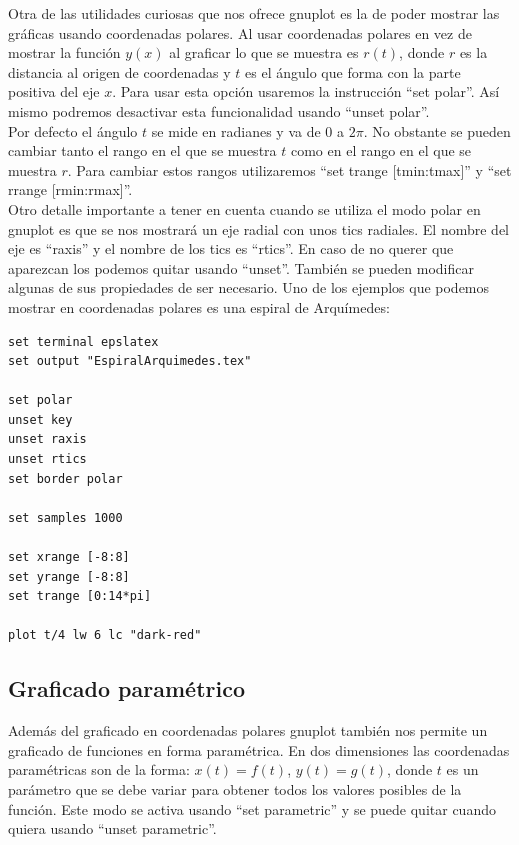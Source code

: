 \documentclass[11pt,a4paper,twoside,pdf]{article}
\numberwithin{equation}{section}
\begin{document}
Otra de las utilidades curiosas que nos ofrece gnuplot es la de poder mostrar las gráficas usando coordenadas polares. Al usar coordenadas polares en vez de mostrar la función $y(x)$ al graficar lo que se muestra es $r(t)$, donde $r$ es la distancia al origen de coordenadas y $t$ es el ángulo que forma con la parte positiva del eje $x$. Para usar esta opción usaremos la instrucción ``set polar''. Así mismo podremos desactivar esta funcionalidad usando ``unset polar''. \\

Por defecto el ángulo $t$ se mide en radianes y va de $0$ a $2\pi$. No obstante se pueden cambiar tanto el rango en el que se muestra $t$ como en el rango en el que se muestra  $r$. Para cambiar estos rangos utilizaremos ``set trange [tmin:tmax]'' y ``set rrange [rmin:rmax]''. \\

Otro detalle importante a tener en cuenta cuando se utiliza el modo polar en gnuplot es que se nos mostrará un eje radial con unos tics radiales. El nombre del eje es ``raxis'' y el nombre de los tics es ``rtics''. En caso de no querer que aparezcan los podemos quitar usando ``unset''. También se pueden modificar algunas de sus propiedades de ser necesario. Uno de los ejemplos que podemos mostrar en coordenadas polares es una espiral de Arquímedes:

\begin{lstlisting}[language=Gnuplot]
set terminal epslatex
set output "EspiralArquimedes.tex"

set polar
unset key
unset raxis
unset rtics
set border polar

set samples 1000

set xrange [-8:8]
set yrange [-8:8]
set trange [0:14*pi]

plot t/4 lw 6 lc "dark-red"
\end{lstlisting}

\subsection{Graficado paramétrico}

Además del graficado en coordenadas polares gnuplot también nos permite un graficado de funciones en forma paramétrica. En dos dimensiones las coordenadas paramétricas son de la forma: $x(t) = f(t)$, $y(t) = g(t)$, donde $t$ es un parámetro que se debe variar para obtener todos los valores posibles de la función. Este modo se activa usando ``set parametric'' y se puede quitar cuando quiera usando ``unset parametric''. \\
\end{document}

